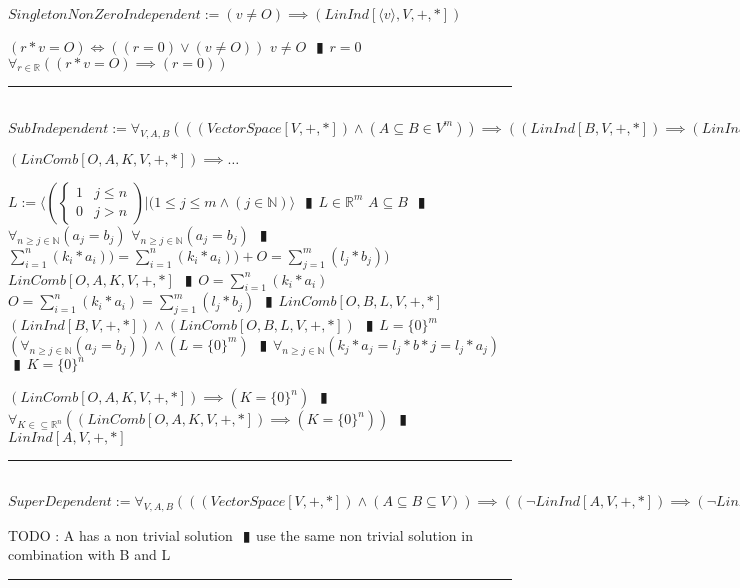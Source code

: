 \documentclass{book}
\newcommand{\abr}{:=}
\newcommand{\pipe}{$\phantom{(}\vrectangleblack\phantom{)}$}
\begin{document}
$SingletonNonZeroIndependent \abr (v \neq O) \implies (LinInd[\langle v \rangle, V, +, *])$
\begin{enumerate}
  \lit $(r * v = O) \iff ((r = 0) \lor (v \neq O))$
  \lit $v \neq O$ \pipe $r = 0$
  \lit $\forall_{r \in \mathbb{R}}((r * v = O) \implies (r = 0))$
\end{enumerate} \vspace{.75mm} \hrule \vspace{.75mm} \ \\ 

$SubIndependent \abr \forall_{V, A, B}(((VectorSpace[V, +, *]) \land (A \subseteq B \in V^m)) \implies ((LinInd[B, V, +, *]) \implies (LinInd[A, V, +, *])))$
\begin{enumerate}
  \lit $(LinComb[O, A, K, V, +, *]) \implies \ldots$
  \begin{enumerate}
    \lit $L \abr \langle \left(\begin{cases} 
      1 & j \leq n \\
      0 & j > n 
    \end{cases}\right) | (1 \leq j \leq m \land (j \in \mathbb{N}) \rangle$ \pipe $L \in \mathbb{R}^m$
    \lit $A \subseteq B$ \pipe $\forall_{n \geq j \in \mathbb{N}}(a_j = b_j)$
    \lit $\forall_{n \geq j \in \mathbb{N}}(a_j = b_j)$ \pipe $\sum_{i = 1}^{n}(k_i * a_i)) = \sum_{i = 1}^{n}(k_i * a_i)) + O = \sum_{j = 1}^{m}(l_j * b_j))$
    \lit $LinComb[O, A, K, V, +, *]$ \pipe $O = \sum_{i = 1}^{n}(k_i * a_i)$
    \lit $O = \sum_{i = 1}^{n}(k_i * a_i) = \sum_{j = 1}^{m}(l_j * b_j)$ \pipe $LinComb[O, B, L, V, +, *]$
    \lit $(LinInd[B, V, +, *]) \land (LinComb[O, B, L, V, +, *])$ \pipe $L = \{0\}^m$ 
    \lit $(\forall_{n \geq j \in \mathbb{N}}(a_j = b_j)) \land (L = \{0\}^m)$ \pipe $\forall_{n \geq j \in \mathbb{N}}(k_j * a_j = l_j * b*j = l_j * a_j)$ \pipe $K = \{0\}^n$
  \end{enumerate}
  \lit $(LinComb[O, A, K, V, +, *]) \implies (K = \{0\}^n)$ \pipe $\forall_{K \in \subseteq \mathbb{R}^n}((LinComb[O, A, K, V, +, *]) \implies (K = \{0\}^n))$ \pipe $LinInd[A, V, +, *]$
\end{enumerate} \vspace{.75mm} \hrule \vspace{.75mm} \ \\ 

$SuperDependent \abr \forall_{V, A, B}(((VectorSpace[V, +, *]) \land (A \subseteq B \subseteq V)) \implies ((\lnot LinInd[A, V, +, *]) \implies (\lnot LinInd[B, V, +, *])))$
\begin{enumerate}
  \lit TODO :  A has a non trivial solution \pipe use  the same non trivial solution in combination with B and L
\end{enumerate} \vspace{.75mm} \hrule \vspace{.75mm} \ \\ 
\end{document}

